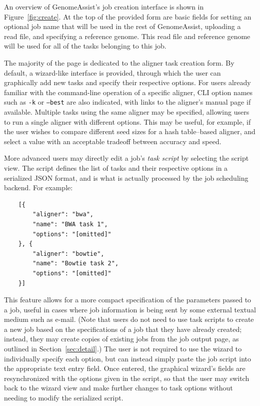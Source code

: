\documentclass[11pt,twocolumn]{article}
\begin{document}
An overview of GenomeAssist's job creation interface is shown in
Figure~\ref{fig:create}.
At the top of the provided form are basic fields for setting an
optional job name that will be used in the rest of GenomeAssist,
uploading a read file, and specifying a reference genome.
This read file and reference genome will be used for all of the tasks
belonging to this job.

The majority of the page is dedicated to the aligner task creation form.
By default, a wizard-like interface is provided, through which the user
can graphically add new tasks and specify their respective options.
For users already familiar with the command-line operation of a specific
aligner, CLI option names such as \texttt{-k} or \texttt{--best} are
also indicated, with links to the aligner's manual page if available.
Multiple tasks using the same aligner may be specified, allowing users
to run a single aligner with different options.
This may be useful, for example, if the user wishes to compare different
seed sizes for a hash table--based aligner, and select a value with an
acceptable tradeoff between accuracy and speed.

More advanced users may directly edit a job's \textit{task script} by
selecting the script view.
The script defines the list of tasks and their respective options in a
serialized JSON format, and is what is actually processed by the job
scheduling backend.
For example:
\begin{verbatim}
    [{
        "aligner": "bwa",
        "name": "BWA task 1",
        "options": "[omitted]"
    }, {
        "aligner": "bowtie",
        "name": "Bowtie task 2",
        "options": "[omitted]"
    }]
\end{verbatim}
This feature allows for a more compact specification of the parameters
passed to a job, useful in cases where job information is being sent by
some external textual medium such as e-mail.
(Note that users do not need to use task scripts to create a new job
based on the specifications of a job that they have already created;
instead, they may create copies of existing jobs from the job output
page, as outlined in Section~\ref{sec:detail}.)
The user is not required to use the wizard to individually specify each
option, but can instead simply paste the job script into the appropriate
text entry field.
Once entered, the graphical wizard's fields are resynchronized with the
options given in the script, so that the user may switch back to the
wizard view and make further changes to task options without needing to
modify the serialized script.
\end{document}
